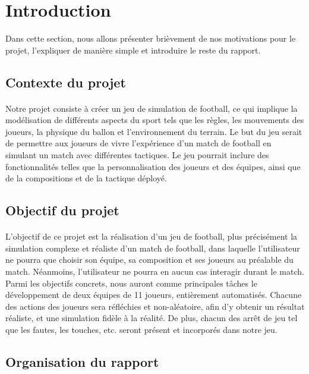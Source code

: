 \newpage
\section{Introduction}
\label{sec:introduction}

Dans cette section, nous allons présenter brièvement de nos motivations pour le projet, l'expliquer de manière simple et introduire le reste du rapport. 


\subsection{Contexte du projet}
\paragraph{}
    Notre projet consiste à créer un jeu de simulation de football, ce qui implique la modélisation de différents aspects du sport tels que les règles, les mouvements des joueurs, la physique du ballon et l'environnement du terrain. Le but du jeu serait de permettre aux joueurs de vivre l'expérience d'un match de football en simulant un match  avec différentes tactiques. Le jeu pourrait inclure des fonctionnalités telles que la personnalisation des joueurs et des équipes, ainsi que de la compositions et de la tactique déployé.


\subsection{Objectif du projet}
\paragraph{}
    L'objectif de ce projet est la réalisation d'un jeu de football, plus précisément la simulation complexe et réaliste d'un match de football, dans laquelle l'utilisateur ne pourra que choisir son équipe, sa composition et ses joueurs au préalable du match. Néanmoins, l'utilisateur ne pourra en aucun cas interagir durant le match. Parmi les objectifs concrets, nous auront comme principales tâches le développement de deux équipes de 11 joueurs, entièrement automatisés. Chacune des actions des joueurs sera réfléchies et non-aléatoire, afin d'y obtenir un résultat réaliste, et une simulation fidèle à la réalité. De plus, chacun des arrêt de jeu tel que les fautes, les touches, etc. seront présent et incorporés dans notre jeu.

\subsection{Organisation du rapport}

\paragraph{}
    